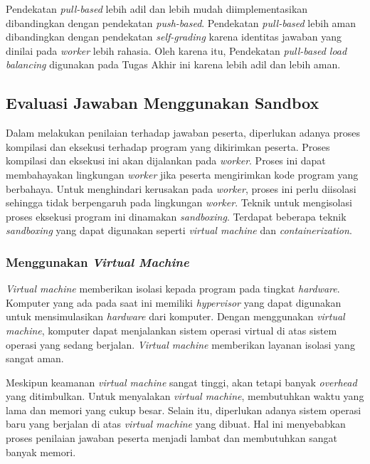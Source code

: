 \par Pendekatan \textit{pull-based} lebih adil dan lebih mudah diimplementasikan dibandingkan dengan pendekatan \textit{push-based}. Pendekatan \textit{pull-based} lebih aman dibandingkan dengan pendekatan \textit{self-grading} karena identitas jawaban yang dinilai pada \textit{worker} lebih rahasia. Oleh karena itu, Pendekatan \textit{pull-based load balancing} digunakan pada Tugas Akhir ini karena lebih adil dan lebih aman.

\subsection{Evaluasi Jawaban Menggunakan Sandbox}

\par Dalam melakukan penilaian terhadap jawaban peserta, diperlukan adanya proses kompilasi dan eksekusi terhadap program yang dikirimkan peserta. Proses kompilasi dan eksekusi ini akan dijalankan pada \textit{worker}. Proses ini dapat membahayakan lingkungan \textit{worker} jika peserta mengirimkan kode program yang berbahaya. Untuk menghindari kerusakan pada \textit{worker}, proses ini perlu diisolasi sehingga tidak berpengaruh pada lingkungan \textit{worker}. Teknik untuk mengisolasi proses eksekusi program ini dinamakan \textit{sandboxing}. Terdapat beberapa teknik \textit{sandboxing} yang dapat digunakan seperti \textit{virtual machine} dan \textit{containerization}.

\subsubsection{Menggunakan \textit{Virtual Machine}}

\par \textit{Virtual machine} memberikan isolasi kepada program pada tingkat \textit{hardware}. Komputer yang ada pada saat ini memiliki \textit{hypervisor} yang dapat digunakan untuk mensimulasikan \textit{hardware} dari komputer. Dengan menggunakan \textit{virtual machine}, komputer dapat menjalankan sistem operasi virtual di atas sistem operasi yang sedang berjalan. \textit{Virtual machine} memberikan layanan isolasi yang sangat aman.

\par Meskipun keamanan \textit{virtual machine} sangat tinggi, akan tetapi banyak \textit{overhead} yang ditimbulkan. Untuk menyalakan \textit{virtual machine}, membutuhkan waktu yang lama dan memori yang cukup besar. Selain itu, diperlukan adanya sistem operasi baru yang berjalan di atas \textit{virtual machine} yang dibuat. Hal ini menyebabkan proses penilaian jawaban peserta menjadi lambat dan membutuhkan sangat banyak memori.


